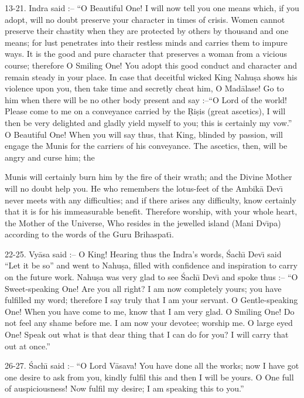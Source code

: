13-21. Indra said :-- ``O Beautiful One! I will now tell you one means which, if you adopt, will no doubt preserve your character in times of crisis. Women cannot preserve their chastity when they are protected by others by thousand and one means; for lust penetrates into their restless minds and carries them to impure ways. It is the good and pure character that preserves a woman from a vicious course; therefore O Smiling One! You adopt this good conduct and character and remain steady in your place. In case that deceitful wicked King Nahu\d{s}a shows his violence upon you, then take time and secretly cheat him, O Mad\=alase! Go to him when there will be no other body present and say :--``O Lord of the world! Please come to me on a conveyance carried by the \d{R}i\d{s}is (great ascetics), I will then be very delighted and gladly yield myself to you; this is certainly my vow.'' O Beautiful One! When you will say thus, that King, blinded by passion, will engage the Munis for the carriers of his conveyance. The ascetics, then, will be angry and curse him; the

Munis will certainly burn him by the fire of their wrath; and the Divine Mother will no doubt help you. He who remembers the lotus-feet of the Ambik\=a Dev\={\i} never meets with any difficulties; and if there arises any difficulty, know certainly that it is for his immeasurable benefit. Therefore worship, with your whole heart, the Mother of the Universe, Who resides in the jewelled island (Mani Dv\={\i}pa) according to the words of the Guru Brihaspat\={\i}.

22-25. Vy\=asa said :-- O King! Hearing thus the Indra's words, \'Sach\={\i} Dev\={\i} said ``Let it be so'' and went to Nahu\d{s}a, filled with confidence and inspiration to carry on the future work. Nahu\d{s}a was very glad to see \'Sach\={\i} Dev\={\i} and spoke thus :-- ``O Sweet-speaking One! Are you all right? I am now completely yours; you have fulfilled my word; therefore I say truly that I am your servant. O Gentle-speaking One! When you have come to me, know that I am very glad. O Smiling One! Do not feel any shame before me. I am now your devotee; worship me. O large eyed One! Speak out what is that dear thing that I can do for you? I will carry that out at once.''

26-27. \'Sach\={\i} said :-- ``O Lord V\=asava! You have done all the works; now I have got one desire to ask from you, kindly fulfil this and then I will be yours. O One full of auspiciousness! Now fulfil my desire; I am speaking this to you.''

